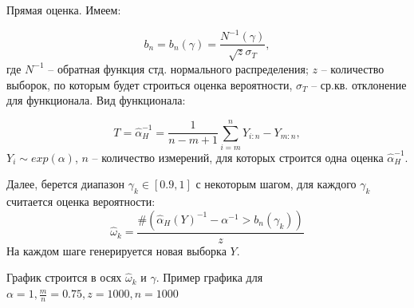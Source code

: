 \documentclass[12pt, specialist, subf, substylefile = spbu.rtx]{disser}
\begin{document}
Прямая оценка. Имеем:

$$
b_n=b_n(\gamma)=\frac{N^{-1}(\gamma)}{\sqrt{z}\sigma_T},
$$
где $N^{-1}$ -- обратная функция стд. нормального распределения;
$z$ -- количество выборок, по которым будет строиться оценка вероятности, $\sigma_T$ -- ср.кв. отклонение для функционала. Вид функционала:

$$
T=\hat{\alpha}_H^{-1}=\frac{1}{n-m+1}\sum_{i=m}^n Y_{i:n}-Y_{m:n},
$$
$Y_i \sim exp(\alpha)$, $n$ -- количество измерений, для которых строится одна оценка $\hat{\alpha}_H^{-1}$.

Далее, берется диапазон $\gamma_k \in [0.9, 1]$ с некоторым шагом, для каждого $\gamma_k$ считается оценка вероятности:
$$
\hat{\omega}_k = \frac{\#\left(\hat{\alpha}_H(Y)^{-1}-\alpha^{-1} > b_n(\gamma_k)  \right)}{z}
$$
На каждом шаге генерируется новая выборка $Y$.

График строится в осях $\hat{\omega}_k$ и $\gamma$. Пример графика для $\alpha=1, \frac{m}{n}=0.75, z=1000, n=1000$


\begin{figure}[!h]
\label{ris:hhnz}
\end{figure}



  
\end{document}
